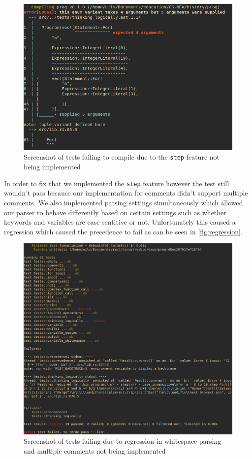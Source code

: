 \documentclass{article}
\begin{document}
\begin{figure}
	\includegraphics[width=\textwidth]{thinking_logically_failing}
	\caption{Screenshot of tests failing to compile due to the \texttt{step}
	feature not being implemented}
	\label{fig:thinking_logically_failing}
\end{figure}

In order to fix that we implemented the \texttt{step} feature however the test
still wouldn't pass because our implementation for comments didn't support
multiple comments. We also implemented parsing settings simultaneously which
allowed our parser to behave differently based on certain settings such as
whether keywords and variables are case sentitive or not. Unfortunately this
caused a regression which caused the precedence to fail as can be seen in
\autoref{fig:regression}.

\begin{figure}
	\includegraphics[width=\textwidth]{regression}
	\caption{Screenshot of tests failing due to regression in whitespace
	parsing and multiple comments not being implemented}
	\label{fig:regression}
\end{figure}
\end{document}
